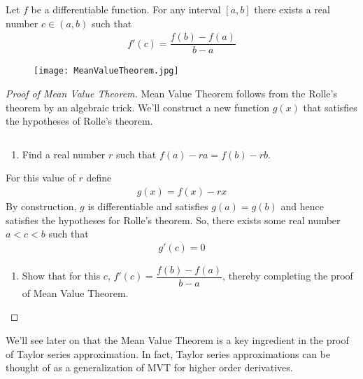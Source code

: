 \begin{theorem}
	Let $f$ be a differentiable function. For any interval $[a,b]$ there exists a real number $c \in (a,b)$ such that
	\begin{align*}
		f'(c) = \dfrac{f(b) - f(a)}{b - a}
	\end{align*}
	\begin{figure}[H]
		\centering
		\texttt{[image: MeanValueTheorem.jpg]}
	\end{figure}
\end{theorem}
\begin{proof}[Proof of Mean Value Theorem]
	Mean Value Theorem follows from the Rolle's theorem by an algebraic trick.
	We'll construct a new function $g(x)$ that satisfies the hypotheses of Rolle's theorem.
	\begin{exercise}$ $
		\begin{enumerate}
			\item Find a real number $r$ such that $f(a) - r a = f(b) - r b$.
		\end{enumerate}
		For this value of $r$ define
		\begin{align*}
			g(x) = f(x) - r x
		\end{align*}
		By construction, $g$ is differentiable and satisfies $g(a) = g(b)$ and hence satisfies the hypotheses for Rolle's theorem. So, there exists some real number $ a < c < b$ such that
		\begin{align*}
			g'(c) = 0
		\end{align*}
		\begin{enumerate}[resume]
			\item Show that for this $c$, $f'(c) = \dfrac{f(b) - f(a)}{b - a}$, thereby completing the proof of Mean Value Theorem.
		\end{enumerate}
	\end{exercise}
\end{proof}

We'll see later on that the Mean Value Theorem is a key ingredient in the proof of Taylor series approximation. In fact, Taylor series approximations can be thought of as a generalization of MVT for higher order derivatives.




